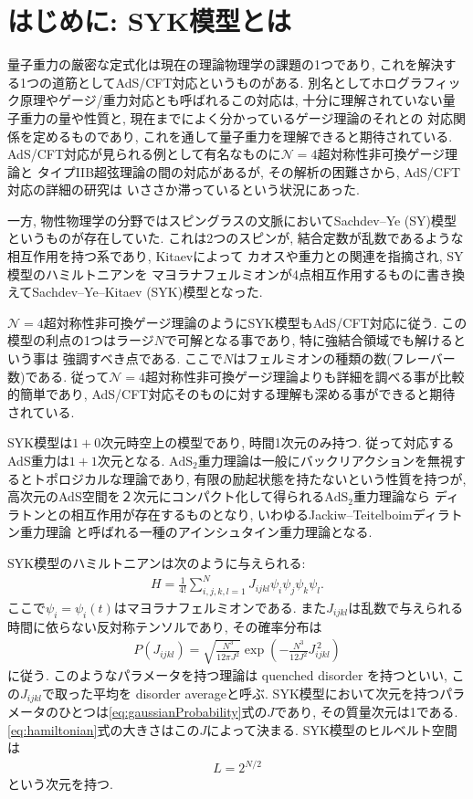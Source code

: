 \section{はじめに: SYK模型とは}
量子重力の厳密な定式化は現在の理論物理学の課題の1つであり, 
これを解決する1つの道筋としてAdS/CFT対応というものがある. 
別名としてホログラフィック原理やゲージ/重力対応とも呼ばれるこの対応は, 
十分に理解されていない量子重力の量や性質と, 現在までによく分かっているゲージ理論のそれとの
対応関係を定めるものであり, これを通して量子重力を理解できると期待されている. 
AdS/CFT対応が見られる例として有名なものに$\mathcal{N}=4$超対称性非可換ゲージ理論と
タイプIIB超弦理論の間の対応があるが, その解析の困難さから, AdS/CFT対応の詳細の研究は
いささか滞っているという状況にあった. 

一方, 物性物理学の分野ではスピングラスの文脈においてSachdev--Ye (SY)模型というものが存在していた. 
これは2つのスピンが, 結合定数が乱数であるような相互作用を持つ系であり, Kitaevによって
カオスや重力との関連を指摘され, SY模型のハミルトニアンを
マヨラナフェルミオンが4点相互作用するものに書き換えてSachdev--Ye--Kitaev (SYK)模型となった. 

$\mathcal{N}=4$超対称性非可換ゲージ理論のようにSYK模型もAdS/CFT対応に従う. 
この模型の利点の1つはラージ$N$で可解となる事であり, 特に強結合領域でも解けるという事は
強調すべき点である. ここで$N$はフェルミオンの種類の数(フレーバー数)である. 
従って$\mathcal{N}=4$超対称性非可換ゲージ理論よりも詳細を調べる事が比較的簡単であり, 
AdS/CFT対応そのものに対する理解も深める事ができると期待されている. 

SYK模型は$1+0$次元時空上の模型であり, 時間1次元のみ持つ. 
従って対応するAdS重力は$1 + 1$次元となる. 
$\mathrm{AdS_2}$重力理論は一般にバックリアクションを無視するとトポロジカルな理論であり, 
有限の励起状態を持たないという性質を持つが, 
高次元のAdS空間を２次元にコンパクト化して得られる$\mathrm{AdS_2}$重力理論なら
ディラトンとの相互作用が存在するものとなり, いわゆるJackiw--Teitelboimディラトン重力理論
と呼ばれる一種のアインシュタイン重力理論となる. 

SYK模型のハミルトニアンは次のように与えられる:
\begin{align}
  H = \frac{1}{4!}\sum_{i,j,k,l = 1}^{N} J_{ijkl}\psi_i\psi_j\psi_k\psi_l.
  \label{eq:hamiltonian}
\end{align}
ここで$\psi_i = \psi_i(t)$はマヨラナフェルミオンである. 
また$J_{ijkl}$は乱数で与えられる時間に依らない反対称テンソルであり, その確率分布は
\begin{align}
  P(J_{ijkl}) = \sqrt{\frac{N^3}{12\pi J^2}}
                \exp\left(-\frac{N^3}{12J^2}J_{ijkl}^{\, 2}\right)
	\label{eq:gaussianProbability}
\end{align}
に従う. 
このようなパラメータを持つ理論は quenched disorder を持つといい, 
この$J_{ijkl}$で取った平均を disorder averageと呼ぶ. 
SYK模型において次元を持つパラメータのひとつは\eqref{eq:gaussianProbability}式の$J$であり, 
その質量次元は1である. \eqref{eq:hamiltonian}式の大きさはこの$J$によって決まる. 
SYK模型のヒルベルト空間は
\begin{align}
	L = 2^{N/2}
\end{align}
という次元を持つ. 


